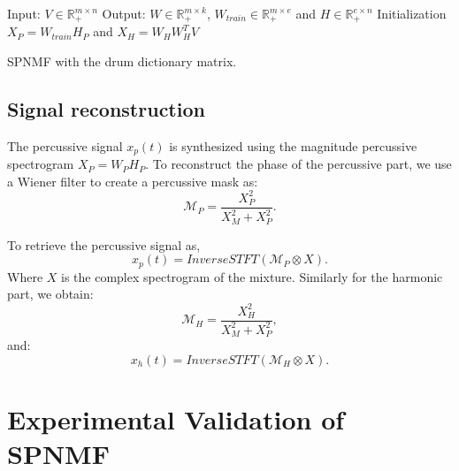 \documentclass[journal]{IEEEtran}
\begin{document}
\begin{algorithm}[h]
 Input: $V \in \mathbb{R}_{+}^{m \times n} $
 Output: $W \in \mathbb{R}_{+}^{m \times k}$, $W_{train} \in \mathbb{R}_+^{m \times e}$ and $H \in \mathbb{R}_{+}^{e \times n}$
 Initialization\;
 $ X_P = W_{train}H_P $ and
 $ X_H = W_HW_H^TV $ 
  
\vspace{0.2cm}
 \caption{SPNMF with the drum dictionary matrix.}\label{AlgoDictionary}
\end{algorithm}


 
 
\subsection{Signal reconstruction}

The percussive signal $x_p(t)$ is synthesized using the magnitude percussive spectrogram $X_P = W_PH_P$. To reconstruct the phase of the percussive part, we use a Wiener filter to create a percussive mask as:
\begin{equation}
\mathcal{M}_P = \frac{X_P^2}{X_M^2 + X_P^2}.
\end{equation} 

To retrieve the percussive signal as, 
\begin{equation}
x_p(t) = InverseSTFT(\mathcal{M}_P \otimes X).
\end{equation}
Where $X$ is the complex spectrogram of the mixture.
Similarly for the harmonic part, we obtain:
\begin{equation}\label{percuweiner}
\mathcal{M}_H = \frac{X_H^2}{X_M^2 + X_P^2},
\end{equation}
and:
\begin{equation}
x_h(t) = InverseSTFT(\mathcal{M}_H \otimes X).
\end{equation}

\section{Experimental Validation of SPNMF}
\label{sec:experiments}
\end{document}

